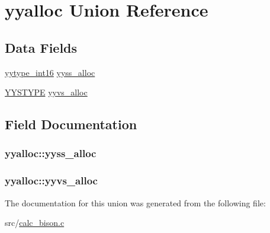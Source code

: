 \hypertarget{unionyyalloc}{\section{yyalloc Union Reference}
\label{unionyyalloc}
}
\subsection*{Data Fields}
\begin{DoxyCompactItemize}
\item 
\hyperlink{calc__bison_8c_ade5b97f0021a4f6c5922ead3744ab297}{yytype\+\_\+int16} \hyperlink{unionyyalloc_a4800e0520a89a4789afa7b5d82197e65}{yyss\+\_\+alloc}
\item 
\hyperlink{unionYYSTYPE}{Y\+Y\+S\+T\+Y\+P\+E} \hyperlink{unionyyalloc_a9326f4fdc6f737a929444427836d8928}{yyvs\+\_\+alloc}
\end{DoxyCompactItemize}


\subsection{Field Documentation}
\hypertarget{unionyyalloc_a4800e0520a89a4789afa7b5d82197e65}{
\subsubsection[{yyss\+\_\+alloc}]{ yyalloc\+::yyss\+\_\+alloc}}\label{unionyyalloc_a4800e0520a89a4789afa7b5d82197e65}
\hypertarget{unionyyalloc_a9326f4fdc6f737a929444427836d8928}{
\subsubsection[{yyvs\+\_\+alloc}]{ yyalloc\+::yyvs\+\_\+alloc}}\label{unionyyalloc_a9326f4fdc6f737a929444427836d8928}


The documentation for this union was generated from the following file\+:\begin{DoxyCompactItemize}
\item 
src/\hyperlink{calc__bison_8c}{calc\+\_\+bison.\+c}\end{DoxyCompactItemize}

